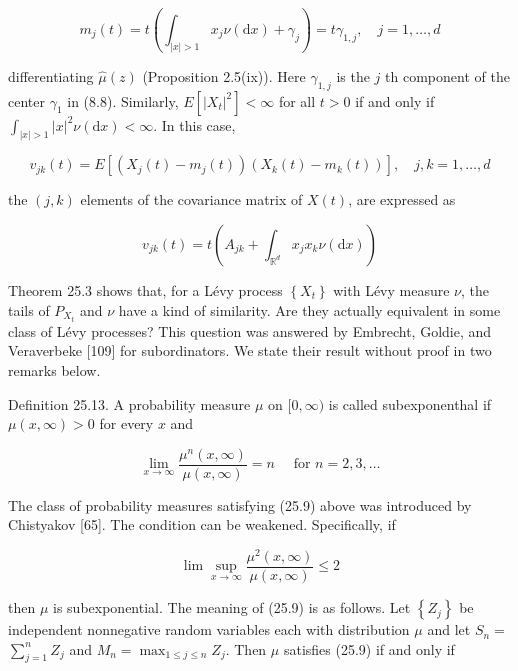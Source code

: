 \documentclass[a4paper,12pt]{article}
\begin{document}
\begin{equation*}
    m_{j}(t)=t\left(\int_{|x|>1} x_{j} \nu(\mathrm{d} x)+\gamma_{j}\right)=t \gamma_{1, j}, \quad j=1, \ldots, d \tag{25.7}
\end{equation*}


differentiating $\widehat{\mu}(z)$ (Proposition 2.5(ix)). Here $\gamma_{1, j}$ is the $j$ th component of the center $\gamma_{1}$ in (8.8). Similarly, $E\left[\left|X_{t}\right|^{2}\right]<\infty$ for all $t>0$ if and only if $\int_{|x|>1}|x|^{2} \nu(\mathrm{d} x)<\infty$. In this case,

$$
    v_{j k}(t)=E\left[\left(X_{j}(t)-m_{j}(t)\right)\left(X_{k}(t)-m_{k}(t)\right)\right], \quad j, k=1, \ldots, d
$$

the $(j, k)$ elements of the covariance matrix of $X(t)$, are expressed as


\begin{equation*}
    v_{j k}(t)=t\left(A_{j k}+\int_{\mathbb{R}^{d}} x_{j} x_{k} \nu(\mathrm{d} x)\right) \tag{25:8}
\end{equation*}


Theorem 25.3 shows that, for a Lévy process $\left\{X_{t}\right\}$ with Lévy measure $\nu$, the tails of $P_{X_{t}}$ and $\nu$ have a kind of similarity. Are they actually equivalent in some class of Lévy processes? This question was answered by Embrecht, Goldie, and Veraverbeke [109] for subordinators. We state their result without proof in two remarks below.

Definition 25.13. A probability measure $\mu$ on $[0, \infty)$ is called subexponenthal if $\mu(x, \infty)>0$ for every $x$ and


\begin{equation*}
    \lim _{x \rightarrow \infty} \frac{\mu^{n}(x, \infty)}{\mu(x, \infty)}=n \quad \text { for } n=2,3, \ldots \tag{25.9}
\end{equation*}


The class of probability measures satisfying (25.9) above was introduced by Chistyakov [65]. The condition can be weakened. Specifically, if

$$
    \lim \sup _{x \rightarrow \infty} \frac{\mu^{2}(x, \infty)}{\mu(x, \infty)} \leq 2
$$

then $\mu$ is subexponential. The meaning of (25.9) is as follows. Let $\left\{Z_{j}\right\}$ be independent nonnegative random variables each with distribution $\mu$ and let $S_{n}=$ $\sum_{j=1}^{n} Z_{j}$ and $M_{n}=\max _{1 \leq j \leq n} Z_{j}$. Then $\mu$ satisfies (25.9) if and only if
\end{document}

